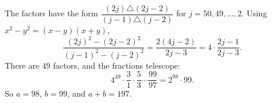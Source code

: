The factors have the form $\dfrac{(2j)\triangle(2j-2)}{(j-1)\triangle(j-2)}$ for $j=50,49,\dots,2$. Using $x^2-y^2=(x-y)(x+y)$,
\[\dfrac{(2j)^2-(2j-2)^2}{(j-1)^2-(j-2)^2}=\dfrac{2(4j-2)}{2j-3}=4\cdot\dfrac{2j-1}{2j-3}.\]
There are $49$ factors, and the fractions telescope:
\[4^{49}\cdot\dfrac31\cdot\dfrac53\cdots\dfrac{99}{97}=2^{98}\cdot99.\]
So $a=98$, $b=99$, and $a+b=\boxed{197}$.
